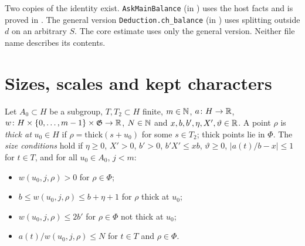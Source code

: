 \begin{remark}
Two copies of the identity exist. \texttt{AskMainBalance} (in ) uses the host facts and is proved in . The general version \texttt{Deduction.ch\_balance} (in ) uses splitting outside $d$ on an arbitrary $S$. The core estimate uses only the general version. Neither file name describes its contents.
\end{remark}

\section{Sizes, scales and kept characters}

\begin{definition}\label{bal:sizes}
Let $A_0\subset H$ be a subgroup, $T,T_2\subset H$ finite, $m\in\mathbb{N}$, $a\colon H\to\mathbb{R}$, $w\colon H\times\{0,\dots,m-1\}\times\mathfrak G\to\mathbb{R}$, $N\in\mathbb{N}$ and $x,b,b',\eta,X',\vartheta\in\mathbb{R}$. A point $\rho$ is \emph{thick at} $u_0\in H$ if $\rho=\mathrm{thick}(s+u_0)$ for some $s\in T_2$; thick points lie in $\Phi$. The \emph{size conditions} hold if $\eta\ge0$, $X'>0$, $b'>0$, $b'X'\le xb$, $\vartheta\ge0$, $|a(t)/b-x|\le1$ for $t\in T$, and for all $u_0\in A_0$, $j<m$:
\begin{itemize}
\item $w(u_0,j,\rho)>0$ for $\rho\in\Phi$;
\item $b\le w(u_0,j,\rho)\le b+\eta+1$ for $\rho$ thick at $u_0$;
\item $w(u_0,j,\rho)\le 2b'$ for $\rho\in\Phi$ not thick at $u_0$;
\item $a(t)/w(u_0,j,\rho)\le N$ for $t\in T$ and $\rho\in\Phi$.
\end{itemize}
\end{definition}

